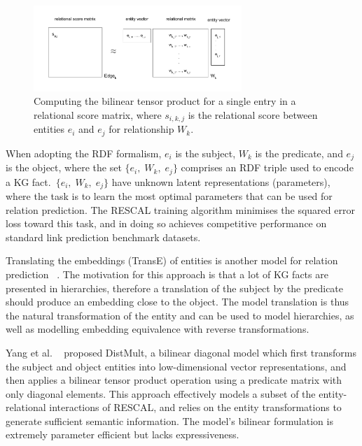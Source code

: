 \begin{figure}[H]
   	\centering
    	\includegraphics[width=0.7\textwidth, height=0.3\textwidth]{bilinear_tensor_product}
	\captionsetup{justification=centering}
	\caption{Computing the bilinear tensor product for a single entry in a relational score matrix, where $ s_{i,k,j} $ is the relational score between entities $ e_i $ and $ e_j$ for relationship $ W_k $. }
\end{figure}

\noindent When adopting the RDF formalism, $ e_i $ is the subject, $ W_k $ is the predicate, and $ e_j $ is the object, where the set $ \{ e_i, \; W_k, \; e_j \} $ comprises an RDF triple used to encode a KG fact.\ $ \{ e_i, \; W_k, \; e_j \} $ have unknown latent representations (parameters), where the task is to learn the most optimal parameters that can be used for relation prediction. The RESCAL training algorithm minimises the squared error loss toward this task, and in doing so achieves competitive performance on standard link prediction benchmark datasets. \par

\noindent Translating the embeddings (TransE) of entities is another model for relation prediction \unskip~\citep{bordes2013translating}. The motivation for this approach is that a lot of KG facts are presented in hierarchies, therefore a translation of the subject by the predicate should produce an embedding close to the object. The model translation is thus the natural transformation of the entity and can be used to model hierarchies, as well as modelling embedding equivalence with reverse transformations. \par

\noindent Yang et al. \unskip~\citep{yang2014embedding} proposed DistMult, a bilinear diagonal model which first transforms the subject and object entities into low-dimensional vector representations, and then applies a bilinear tensor product operation using a predicate matrix with only diagonal elements. This approach effectively models a subset of the entity-relational interactions of RESCAL, and relies on the entity transformations to generate sufficient semantic information. The model's bilinear formulation is extremely parameter efficient but lacks expressiveness. \par

